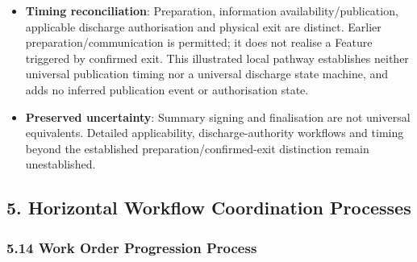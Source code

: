 \begin{itemize}
\begin{itemize}
\item
\texttt{}: Confirmed physical exit triggers departure notifications, updated bed-state communication and finalised-summary dispatch to external care providers under \texttt{}; care-place turnover follows its own responsibility.



\end{itemize}


\item
\textbf{Timing reconciliation}: Preparation, information availability/\allowbreak{}publication, applicable discharge authorisation and physical exit are distinct. Earlier preparation/\allowbreak{}communication is permitted; it does not realise a Feature triggered by confirmed exit. This illustrated local pathway establishes neither universal publication timing nor a universal discharge state machine, and adds no inferred publication event or authorisation state.



\item
\textbf{Preserved uncertainty}: Summary signing and finalisation are not universal equivalents. Detailed applicability, discharge-authority workflows and timing beyond the established preparation/\allowbreak{}confirmed-exit distinction remain unestablished.



\end{itemize}
\label{rad:processes:278}

\par\smallskip
{}\label{rad:processes:280}
\subsection*{5. Horizontal Workflow Coordination Processes}
\label{rad:processes:282}
\subsubsection*{5.14 Work Order Progression Process}
\label{rad:processes:283}


